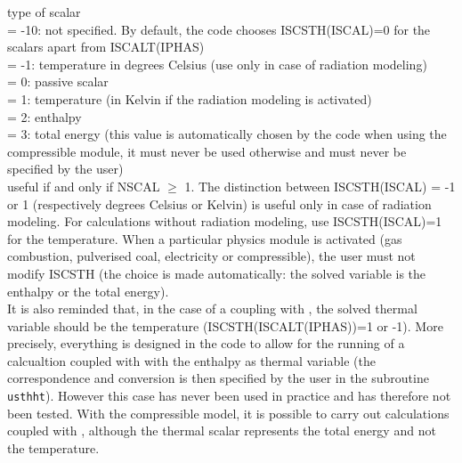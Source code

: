 {type of scalar\\
\hspace*{1.3cm}= -10: not specified. By default, the code chooses
ISCSTH(ISCAL)=0 for the scalars apart from ISCALT(IPHAS)\\
\hspace*{1.3cm}= -1: temperature in degrees Celsius (use only in case of
radiation modeling)\\
\hspace*{1.3cm}= 0: passive scalar\\
\hspace*{1.3cm}= 1: temperature (in Kelvin if the radiation modeling is
activated)\\
\hspace*{1.3cm}= 2: enthalpy\\
\hspace*{1.3cm}= 3: total energy (this value is automatically chosen by the code
when using the compressible module, it must never be used otherwise and must
never be specified by the user)\\
useful if and only if NSCAL $\geqslant$ 1. The distinction between
ISCSTH(ISCAL) = -1 or 1 (respectively degrees Celsius or Kelvin) is
useful only in case of radiation modeling. For calculations without
radiation modeling, use ISCSTH(ISCAL)=1 for the temperature. When a
particular physics module is activated (gas combustion, pulverised coal,
electricity or compressible), the user must not modify ISCSTH (the choice is made
automatically: the solved variable is the enthalpy or the total energy).\\
It is also reminded that, in the case of a coupling with
\syrthes, the solved thermal variable should be the temperature
(ISCSTH(ISCALT(IPHAS))=1 or -1).
More precisely, everything is designed in the code to allow for the
running of a calcualtion coupled with \syrthes with the enthalpy as thermal
variable (the correspondence and conversion is then specified by the user in
the subroutine \texttt{usthht}).
However this case has never been used in practice and has therefore not been
tested. With the compressible model, it is possible to carry out calculations
coupled with \syrthes, although the thermal scalar represents the total
energy and not the temperature.}

